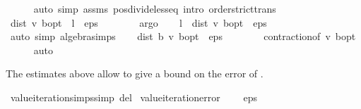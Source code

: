 \begin{isabellebody}
\ \ \ \ \isamarkupfalse%
\ {\isacharparenleft}{\kern0pt}auto\ simp{\isacharcolon}{\kern0pt}\ assms{\isacharparenleft}{\kern0pt}{}{\isacharparenright}{\kern0pt}\ pos{\isacharunderscore}{\kern0pt}divide{\isacharunderscore}{\kern0pt}less{\isacharunderscore}{\kern0pt}eq\ intro{\isacharcolon}{\kern0pt}\ order{\isachardot}{\kern0pt}strict{\isacharunderscore}{\kern0pt}trans{}{\isacharparenright}{\kern0pt}\isanewline
\ \ \isamarkupfalse%
\ {\isachardoublequoteopen}dist\ v\ {\isasymnu}\isactrlsub b{\isacharunderscore}{\kern0pt}opt\ {\isacharasterisk}{\kern0pt}\ l\ {\isacharless}{\kern0pt}\ eps\ {\isacharslash}{\kern0pt}\ {}{\isachardoublequoteclose}\isanewline
\ \ \ \ \isamarkupfalse%
\ argo\isanewline
\ \ \isamarkupfalse%
\ {\isachardoublequoteopen}l\ {\isacharasterisk}{\kern0pt}\ dist\ v\ {\isasymnu}\isactrlsub b{\isacharunderscore}{\kern0pt}opt\ {\isacharless}{\kern0pt}\ eps\ {\isacharslash}{\kern0pt}\ {}{\isachardoublequoteclose}\isanewline
\ \ \ \ \isamarkupfalse%
\ {\isacharparenleft}{\kern0pt}auto\ simp{\isacharcolon}{\kern0pt}\ algebra{\isacharunderscore}{\kern0pt}simps{\isacharparenright}{\kern0pt}\isanewline
\ \ \isamarkupfalse%
\ {\isachardoublequoteopen}dist\ {\isacharparenleft}{\kern0pt}{\isasymL}\isactrlsub b\ v{\isacharparenright}{\kern0pt}\ {\isasymnu}\isactrlsub b{\isacharunderscore}{\kern0pt}opt\ {\isacharless}{\kern0pt}\ eps\ {\isacharslash}{\kern0pt}\ {}{\isachardoublequoteclose}\isanewline
\ \ \ \ \isamarkupfalse%
\ contraction{\isacharunderscore}{\kern0pt}{\isasymL}{\isacharbrackleft}{\kern0pt}of\ v\ {\isasymnu}\isactrlsub b{\isacharunderscore}{\kern0pt}opt{\isacharbrackright}{\kern0pt}\ \isanewline
\ \ \ \ \isamarkupfalse%
\ auto\isanewline
{}\isamarkupfalse%
%
\endisatagproof
{\isafoldproof}%
%
\isadelimproof
%
\endisadelimproof
%
\begin{isamarkuptext}%
The estimates above allow to give a bound on the error of .%
\end{isamarkuptext}\isamarkuptrue%
\isamarkupfalse%
\ value{\isacharunderscore}{\kern0pt}iteration{\isachardot}{\kern0pt}simps{\isacharbrackleft}{\kern0pt}simp\ del{\isacharbrackright}{\kern0pt}\isanewline
\isanewline
{}\isamarkupfalse%
\ value{\isacharunderscore}{\kern0pt}iteration{\isacharunderscore}{\kern0pt}error{\isacharcolon}{\kern0pt}\ \isanewline
\ \ \ {\isachardoublequoteopen}eps\ {\isachargreater}{\kern0pt}\ {}{\isachardoublequoteclose}\isanewline

\end{isabellebody}
